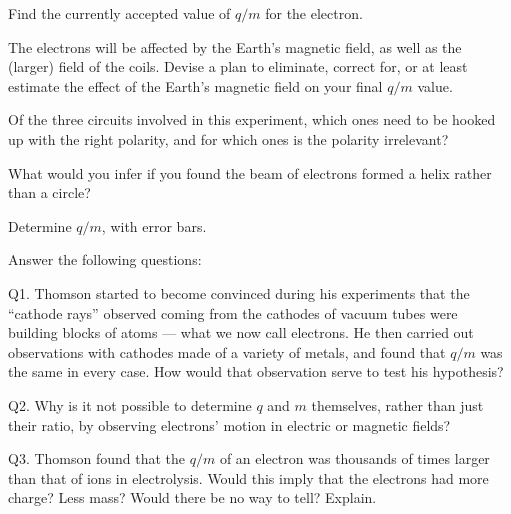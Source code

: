 \prelabquestion  Find the currently accepted value of $q/m$ for the electron.

\prelabquestion  The electrons will be affected by the Earth's magnetic
field, as well as the (larger) field of the coils. Devise a
plan to eliminate, correct for, or at least estimate the
effect of the Earth's magnetic field on your final $q/m$ value.

\prelabquestion  Of the three circuits involved in this experiment, which
ones need to be hooked up with the right polarity, and for
which ones is the polarity irrelevant?

\prelabquestion  What would you infer if you found the beam of electrons
formed a helix rather than a circle?

\analysis

Determine $q/m$, with error bars.

Answer the following questions:

Q1. Thomson started to become convinced during his
experiments that the ``cathode rays'' observed coming from
the cathodes of vacuum tubes were building blocks of atoms
--- what we now call electrons. He then carried out
observations with cathodes made of a variety of metals, and
found that $q/m$ was the same in every case. How would that
observation serve to test his hypothesis?

Q2. Why is it not possible to determine $q$ and $m$
themselves, rather than just their ratio, by observing
electrons' motion in electric or magnetic fields?

Q3. Thomson found that the $q/m$ of an electron was
thousands of times larger than that of ions in electrolysis.
Would this imply that the electrons had more charge? Less
mass? Would there be no way to tell? Explain.
